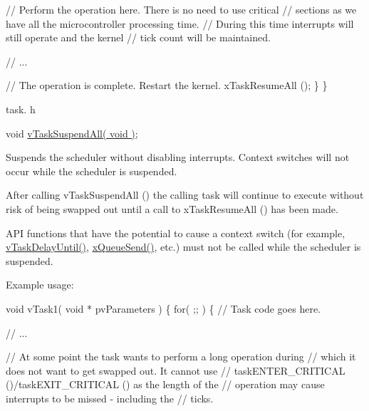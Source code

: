 \begin{DoxyPre}      // Perform the operation here.  There is no need to use critical
      // sections as we have all the microcontroller processing time.
      // During this time interrupts will still operate and the kernel
      // tick count will be maintained.\end{DoxyPre}



\begin{DoxyPre}      // ...\end{DoxyPre}



\begin{DoxyPre}      // The operation is complete.  Restart the kernel.
      xTaskResumeAll ();
  \}
\}
\end{DoxyPre}


task. h 
\begin{DoxyPre}void \hyperlink{externals_2freertos_2include_2task_8h_a366b302eba79d10b5ee2a3756f0fcc43}{vTaskSuspendAll( void )};\end{DoxyPre}


Suspends the scheduler without disabling interrupts. Context switches will not occur while the scheduler is suspended.

After calling v\+Task\+Suspend\+All () the calling task will continue to execute without risk of being swapped out until a call to x\+Task\+Resume\+All () has been made.

A\+PI functions that have the potential to cause a context switch (for example, \hyperlink{vendor_2ceedling_2plugins_2freertos_2src_2freertos_2include_2task_8h_a067da3e949e248096ec6c01f9cb75a47}{v\+Task\+Delay\+Until()}, \hyperlink{externals_2freertos_2include_2queue_8h_af7eb49d3249351176992950d9185abe9}{x\+Queue\+Send()}, etc.) must not be called while the scheduler is suspended.

Example usage\+: 
\begin{DoxyPre}
void vTask1( void * pvParameters )
\{
    for( ;; )
    \{
     // Task code goes here.\end{DoxyPre}



\begin{DoxyPre}     // ...\end{DoxyPre}



\begin{DoxyPre}     // At some point the task wants to perform a long operation during
     // which it does not want to get swapped out.  It cannot use
     // taskENTER\_CRITICAL ()/taskEXIT\_CRITICAL () as the length of the
     // operation may cause interrupts to be missed - including the
     // ticks.\end{DoxyPre}



